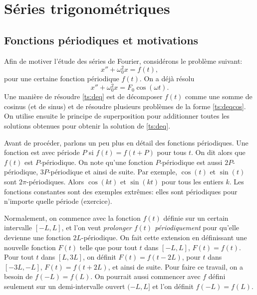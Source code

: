 \sectionnewpage
\section{Séries trigonométriques} \label{ts:section}


\subsection{Fonctions périodiques et motivations}

Afin de motiver l'étude des séries de Fourier, considérons le problème suivant:
\begin{equation} \label{ts:deq}
x'' + \omega_0^2 x = f(t) ,
\end{equation}
pour une certaine fonction périodique $f(t)$.
On a déjà résolu
\begin{equation} \label{ts:deqcos}
x'' + \omega_0^2 x = F_0 \cos ( \omega t) .
\end{equation}
Une manière de résoudre \eqref{ts:deq} est de décomposer $f(t)$ comme une somme de cosinus (et de sinus) et de résoudre plusieurs problèmes de la forme  \eqref{ts:deqcos}.  On utilise ensuite le principe de superposition pour additionner toutes les solutions obtenues pour obtenir la solution de \eqref{ts:deq}.

Avant de procéder, parlons un peu plus en détail des fonctions périodiques. 
Une fonction est  \emph{} avec période $P$ si
$f(t) = f(t+P)$ pour tous $t$.  On dit alors que $f(t)$ est $P$-périodique.
On note qu'une fonction $P$-périodique est aussi $2P$-périodique, $3P$-périodique
et ainsi de suite.
Par exemple, $\cos (t)$ et $\sin (t)$ sont
$2\pi$-périodiques.  Alors $\cos (kt)$ et $\sin (kt)$ pour tous les entiers $k$.  Les fonctions constantes sont des exemples extrêmes: elles sont périodiques pour n'importe quelle période (exercice). 

Normalement, on commence avec la fonction $f(t)$ définie sur un certain intervalle $[-L,L]$,
et l'on veut
\emph{prolonger $f(t)$ périodiquement}
pour qu'elle devienne une fonction $2L$-périodique.  On fait cette extension en définissant une nouvelle fonction $F(t)$
telle que pour tout $t$ dans $[-L,L]$, $F(t) = f(t)$.  Pour tout $t$ dans $[L,3L]$,
on définit $F(t) = f(t-2L)$, pour $t$ dans $[-3L,-L]$, $F(t) = f(t+2L)$, et ainsi de suite.
Pour faire ce travail, on a besoin de $f(-L) = f(L)$.
On pourrait aussi commencer avec $f$
défini seulement sur un demi-intervalle ouvert $(-L,L]$ et l'on définit $f(-L) = f(L)$.

